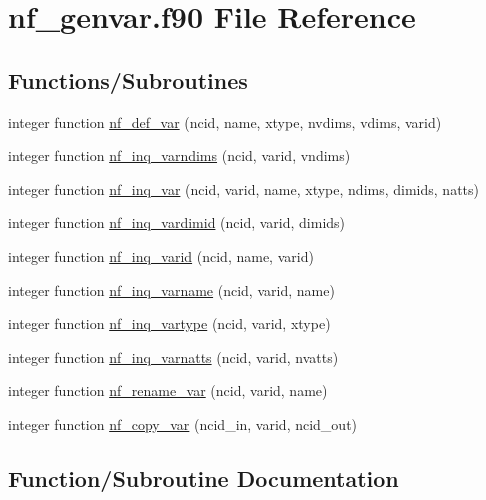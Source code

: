 \hypertarget{nf__genvar_8f90}{}\section{nf\+\_\+genvar.\+f90 File Reference}
\label{nf__genvar_8f90}
\subsection*{Functions/\+Subroutines}
\begin{DoxyCompactItemize}
\item 
integer function \hyperlink{nf__genvar_8f90_a21a4b1381e03b1ab8477687723bdfb4b}{nf\+\_\+def\+\_\+var} (ncid, name, xtype, nvdims, vdims, varid)
\item 
integer function \hyperlink{nf__genvar_8f90_ad20e90a6eea21b7ca37b64e492258a9a}{nf\+\_\+inq\+\_\+varndims} (ncid, varid, vndims)
\item 
integer function \hyperlink{nf__genvar_8f90_a8e440dd17d73bef324eac899de92b297}{nf\+\_\+inq\+\_\+var} (ncid, varid, name, xtype, ndims, dimids, natts)
\item 
integer function \hyperlink{nf__genvar_8f90_a0272c24bf5b50b1e7e0972937967ae0b}{nf\+\_\+inq\+\_\+vardimid} (ncid, varid, dimids)
\item 
integer function \hyperlink{nf__genvar_8f90_ac66a3256fad322f32801ecddd81a58db}{nf\+\_\+inq\+\_\+varid} (ncid, name, varid)
\item 
integer function \hyperlink{nf__genvar_8f90_ae62acb4cf6e11df12ff2ebb541325de3}{nf\+\_\+inq\+\_\+varname} (ncid, varid, name)
\item 
integer function \hyperlink{nf__genvar_8f90_a3bf29346233ca9243a8dc0341919c068}{nf\+\_\+inq\+\_\+vartype} (ncid, varid, xtype)
\item 
integer function \hyperlink{nf__genvar_8f90_a7f285e7d982a38d549d68ae233859d67}{nf\+\_\+inq\+\_\+varnatts} (ncid, varid, nvatts)
\item 
integer function \hyperlink{nf__genvar_8f90_a0415c842d5919fc1f205cfd9b535c734}{nf\+\_\+rename\+\_\+var} (ncid, varid, name)
\item 
integer function \hyperlink{nf__genvar_8f90_ac71cbb4a76b0144764e542c8350b733c}{nf\+\_\+copy\+\_\+var} (ncid\+\_\+in, varid, ncid\+\_\+out)
\end{DoxyCompactItemize}


\subsection{Function/\+Subroutine Documentation}
\mbox{\label{nf__genvar_8f90_ac71cbb4a76b0144764e542c8350b733c}} 
